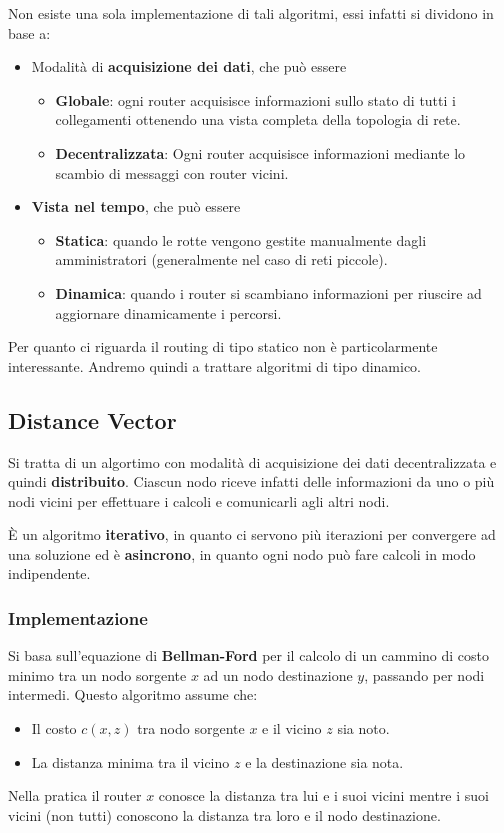 Non esiste una sola implementazione di tali algoritmi, essi infatti si 
dividono in base a:
\begin{itemize}
	\item Modalità di \textbf{acquisizione dei dati}, che può essere
		\begin{itemize}
			\item \textbf{Globale}: ogni router acquisisce informazioni
				sullo stato di tutti i collegamenti ottenendo una
				vista completa della topologia di rete.
			\item \textbf{Decentralizzata}: Ogni router acquisisce
				informazioni mediante lo scambio di messaggi con 
				router vicini.
		\end{itemize}
	\item \textbf{Vista nel tempo}, che può essere
		\begin{itemize}
			\item \textbf{Statica}: quando le rotte vengono gestite
				manualmente dagli amministratori (generalmente nel caso
				di reti piccole).
			\item \textbf{Dinamica}: quando i router si scambiano 
				informazioni per riuscire ad aggiornare dinamicamente 
				i percorsi.
		\end{itemize}
\end{itemize}
Per quanto ci riguarda il routing di tipo statico non è particolarmente
interessante. Andremo quindi a trattare algoritmi di tipo dinamico.

\subsection{Distance Vector}
Si tratta di un algortimo con modalità di acquisizione dei dati
decentralizzata e quindi \textbf{distribuito}. Ciascun nodo riceve
infatti delle informazioni da uno o più nodi vicini per effettuare
i calcoli e comunicarli agli altri nodi.

\`E un algoritmo \textbf{iterativo}, in quanto ci servono più
iterazioni per convergere ad una soluzione ed è \textbf{asincrono},
in quanto ogni nodo può fare calcoli in modo indipendente.

\subsubsection{Implementazione}
Si basa sull'equazione di \textbf{Bellman-Ford} per il calcolo di un
cammino di costo minimo tra un nodo sorgente $x$ ad un nodo 
destinazione $y$, passando per nodi intermedi. Questo algoritmo assume
che:
\begin{itemize}
	\item Il costo $c(x,z)$ tra nodo sorgente $x$ e il vicino $z$ sia
		noto.
	\item La distanza minima tra il vicino $z$ e la destinazione sia
		nota.
\end{itemize}
Nella pratica il router $x$ conosce la distanza tra lui e i suoi vicini
mentre i suoi vicini (non tutti) conoscono la distanza tra loro e il
nodo destinazione.

